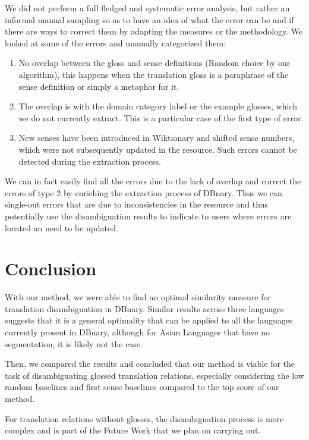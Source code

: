 \documentclass[10pt, a4paper]{article}
\begin{document}
We did not perform a full fledged and systematic error analysis, but rather an informal manual sampling so as to have an idea of what the error can be and if there are ways to correct them by adapting the measures or the methodology.
We looked at some of the errors and manually categorized them: 
\begin{enumerate}
\item No overlap between the gloss and sense definitions (Random choice by our algorithm), this happens when the translation gloss is a paraphrase of the sense definition or simply a metaphor for it.
\item The overlap is with the domain category label or the example glosses, which we do not currently extract. This is a particular case of the first type of error.
\item New senses have been introduced in Wiktionary and shifted sense numbers, which were not subsequently updated in the resource. Such errors cannot be detected during the extraction process.
\end{enumerate}

We can in fact easily find all the errors due to the lack of overlap and correct the errors of type 2 by enriching the extraction process of DBnary. Thus we can single-out errors that are due to inconsistencies in the resource and thus potentially use the disambiguation results to indicate to users where errors are located an need to be updated.

\section{Conclusion}

With our method, we were able to find an optimal similarity measure for translation disambiguation in DBnary. Similar results across three languages suggests that it is a general optimality that can be applied to all the languages currently present in DBnary, although for Asian Languages that have no segmentation, it is likely not the case.

Then, we compared the results and concluded that our method is viable for the task of disambiguating glossed translation relations, especially considering the low random baselines and first sense baselines compared to the top score of our method.

For translation relations without glosses, the disambiguation process is more complex and is part of the Future Work that we plan on carrying out.




\end{document}
